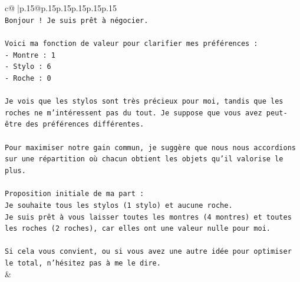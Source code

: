 \documentclass{article}
\begin{document}
{\begin{supertabular}{c@{$\;$}|p{.15\linewidth}@{}p{.15\linewidth}p{.15\linewidth}p{.15\linewidth}p{.15\linewidth}p{.15\linewidth}}
{{{\\ 
\texttt{Bonjour ! Je suis prêt à négocier.} \\
\\ 
\texttt{Voici ma fonction de valeur pour clarifier mes préférences :} \\
\texttt{{-} Montre : 1} \\
\texttt{{-} Stylo : 6} \\
\texttt{{-} Roche : 0} \\
\\ 
\texttt{Je vois que les stylos sont très précieux pour moi, tandis que les roches ne m'intéressent pas du tout. Je suppose que vous avez peut{-}être des préférences différentes.} \\
\\ 
\texttt{Pour maximiser notre gain commun, je suggère que nous nous accordions sur une répartition où chacun obtient les objets qu'il valorise le plus.} \\
\\ 
\texttt{Proposition initiale de ma part :} \\
\texttt{Je souhaite tous les stylos (1 stylo) et aucune roche.} \\
\texttt{Je suis prêt à vous laisser toutes les montres (4 montres) et toutes les roches (2 roches), car elles ont une valeur nulle pour moi.} \\
\\ 
\texttt{Si cela vous convient, ou si vous avez une autre idée pour optimiser le total, n'hésitez pas à me le dire.} \\
            }
        }
    }
    & \\ \\


\end{supertabular}}
\end{document}

